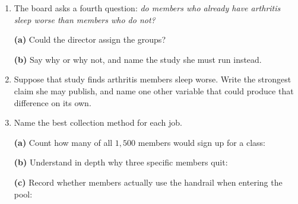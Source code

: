 \documentclass[10pt]{article}
\begin{document}
\vspace{0.03in}

\boxguard
\begin{tcolorbox}[colback=white, colframe=black!40, breakable,
    title=\textbf{Tier E --- Extension},
    fonttitle=\bfseries, arc=2mm, left=3mm, right=3mm, top=1.5mm, bottom=1.5mm]
\small
\begin{enumerate}[leftmargin=1.6em, itemsep=4pt, topsep=3pt]

  \item The board asks a fourth question: \emph{do members who already have
        arthritis sleep worse than members who do not?}

        \textbf{(a)} Could the director assign the groups? \blank{2cm}

        \textbf{(b)} Say why or why not, and name the study she must run
        instead. \writeline

  \item Suppose that study finds arthritis members sleep worse. Write the
        strongest claim she may publish, and name one other variable that could
        produce that difference on its own.

  \item Name the best collection method for each job.

        \textbf{(a)} Count how many of all $1{,}500$ members would sign up for a
        class: \blank{4.4cm}

        \textbf{(b)} Understand in depth why three specific members quit:
        \blank{4.4cm}

        \textbf{(c)} Record whether members actually use the handrail when
        entering the pool: \blank{4.4cm}
\end{enumerate}
\end{tcolorbox}
\end{document}
